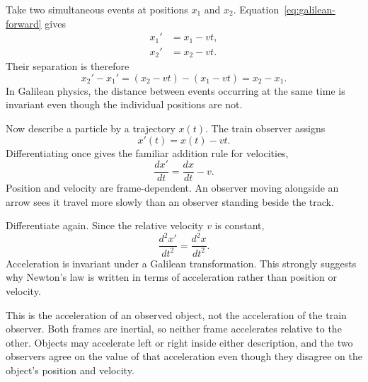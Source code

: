 Take two simultaneous events at positions \(x_1\) and \(x_2\). Equation~\eqref{eq:galilean-forward} gives
\begin{align}
x_1'&=x_1-vt,\\
x_2'&=x_2-vt.
\end{align}
Their separation is therefore
\begin{equation}
x_2'-x_1'=(x_2-vt)-(x_1-vt)=x_2-x_1.
\end{equation}
In Galilean physics, the distance between events occurring at the same time is invariant even though the individual positions are not.

\begin{classroomqa}
\end{classroomqa}

Now describe a particle by a trajectory \(x(t)\). The train observer assigns
\begin{equation}
x'(t)=x(t)-vt.
\end{equation}
Differentiating once gives the familiar addition rule for velocities,
\begin{equation}
\frac{dx'}{dt}=\frac{dx}{dt}-v.
\end{equation}
Position and velocity are frame-dependent. An observer moving alongside an arrow sees it travel more slowly than an observer standing beside the track.

Differentiate again. Since the relative velocity \(v\) is constant,
\begin{equation}
\frac{d^2x'}{dt^2}=\frac{d^2x}{dt^2}.
\end{equation}
Acceleration is invariant under a Galilean transformation. This strongly suggests why Newton's law is written in terms of acceleration rather than position or velocity.

This is the acceleration of an observed object, not the acceleration of the train observer. Both frames are inertial, so neither frame accelerates relative to the other. Objects may accelerate left or right inside either description, and the two observers agree on the value of that acceleration even though they disagree on the object's position and velocity.

